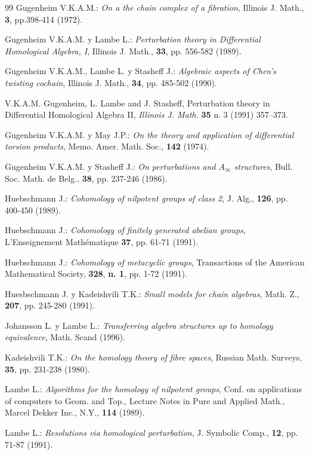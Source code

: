 \begin{thebibliography}{99}
 Gugenheim V.K.A.M.: {\em On a the chain complex of a
fibration}, Illinois J. Math., {\bf 3}, pp.398-414 (1972).

 Gugenheim V.K.A.M. y Lambe L.: {\em Perturbation theory
in Di\-ffe\-ren\-tial Homological Algebra, I}, Illinois J. Math., {\bf
33}, pp. 556-582 (1989).

 Gugenheim V.K.A.M., Lambe L. y Stasheff J.: {\em
Algebraic aspects of Chen's twisting cochain}, Illinois J. Math.,
{\bf 34}, pp. 485-502 (1990).

 V.K.A.M. Gugenheim, L. Lambe and
J. Stasheff, Perturbation theory in Di\-ffe\-rential Homological
Algebra  II, {\em Illinois J. Math. \/} {\bf 35}
n. 3 (1991) 357--373.

 Gugenheim V.K.A.M. y May J.P.: {\em On the theory
and application of differential torsion products}, Memo. Amer. Math. Soc.,
{\bf 142} (1974).

 Gugenheim V.K.A.M. y Stasheff J.: {\em On
perturbations and $A_{\infty}$ structures}, Bull. Soc. Math.
de Belg., {\bf 38}, pp. 237-246 (1986).

 Huebschmann J.: {\em Cohomology of nilpotent groups of
class 2}, J. Alg., {\bf 126}, pp. 400-450 (1989).

 Huebschmann J.: {\em Cohomology of finitely
generated abelian groups}, L'Enseignement Math\'{e}matique {\bf 37},
pp. 61-71 (1991).

 Huebschmann J.: {\em Cohomology of metacyclic groups},
Transactions of the American Mathematical Society, {\bf  328}, {\bf n. 1},
pp. 1-72 (1991).

 Huesbschmann J. y Kadeishvili T.K.: {\em Small models
for chain algebras}, Math. Z., {\bf 207}, pp. 245-280 (1991).

 Johansson L. y Lambe L.: {\em Transferring algebra
structures up to homology equivalence}, Math. Scand (1996).

 Kadeishvili T.K.: {\em On the homology theory of
fibre spaces}, Russian Math. Surveys, {\bf 35}, pp. 231-238
(1980).

 Lambe L.: {\em Algorithms for the homology of
nilpotent groups}, Conf. on applications of computers to Geom.
and Top., Lecture Notes in Pure and Applied Math.,
Marcel Dekker Inc., N.Y., {\bf 114} (1989).

 Lambe L.: {\em Resolutions via homological
perturbation}, J. Symbolic Comp., {\bf 12}, pp. 71-87 (1991).


\end{thebibliography}
